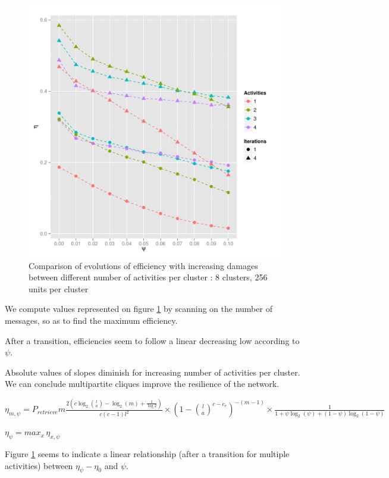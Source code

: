 \documentclass[english,11pt,twocolumn]{article}
\theoremstyle{definition}
\begin{document}
	\begin{figure}[!htb]
		
		\includegraphics[scale=0.50]{Courbes/5portant_psi_c8l256e4}
		\caption{Comparison of evolutions of efficiency with increasing damages between different number of activities per cluster :  8 clusters, 256 units per cluster%
		\label{comppsi}}
	\end{figure}

	We compute values represented on figure \ref{comppsi} by scanning on the number of messages, so as to find the maximum efficiency.	
	
	After a transition, efficiencies seem to follow a linear decreasing low according to $\psi$.
	
	Absolute values of slopes diminish for increasing number of activities per cluster. We can conclude multipartite cliques improve the resilience of the network.
	
	$\eta_{m, \psi} = P_{retrieve} m  \frac{2 \left(c \log_2{l \choose a } - \log_2(m) + \frac{1}{\log 2} \right)}{c(c-1)l^2} \times (1-{l \choose a}^{c - c_e})^{-(m-1)} \times \frac{1}{1 + \psi \log_2(\psi) +(1-\psi) \log_2(1-\psi)} $
	
	$\eta_\psi = max_x \, \eta_{x, \psi}$
	
	
	Figure \ref{comppsi} seems to indicate a linear relationship (after a transition for multiple activities) between $\eta_\psi -\eta_0$ and $\psi$.
\end{document}
